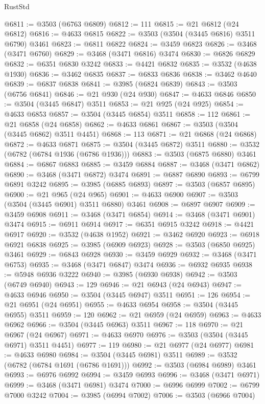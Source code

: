 \begin{lexlean}{RustStd}
\begin{coremodule}
@6811 := @3503 (@6763 @6809)
@6812 := 111
@6815 := @21 @6812 (@24 @6812)
@6816 := @4633 @6815
@6822 := @3503 (@3504 (@3445 @6816) @3511 @6790) @3461
@6823 := @6811 @6822
@6824 := @3459 @6823
@6826 := @3468 (@3471 @6760)
@6829 := @3468 (@3471 @6816) @3474
@6830 := @6826 @6829
@6832 := @6351 @6830 @3242
@6833 := @4421 @6832
@6835 := @3532 (@4638 @1930)
@6836 := @3462 @6835
@6837 := @6833 @6836
@6838 := @3462 @4640
@6839 := @6837 @6838
@6841 := @3985 (@6824 @6839)
@6843 := @3503 (@6756 @6841)
@6846 := @21 @930 (@24 @930)
@6847 := @4633 @6846
@6850 := @3504 (@3445 @6847) @3511
@6853 := @21 @925 (@24 @925)
@6854 := @4633 @6853
@6857 := @3504 (@3445 @6854) @3511
@6858 := 112
@6861 := @21 @6858 (@24 @6858)
@6862 := @4633 @6861
@6867 := @3503 (@3504 (@3445 @6862) @3511 @4451)
@6868 := 113
@6871 := @21 @6868 (@24 @6868)
@6872 := @4633 @6871
@6875 := @3504 (@3445 @6872) @3511
@6880 := @3532 (@6782 (@6784 @1936 (@6786 @1936)))
@6883 := @3503 (@6875 @6880) @3461
@6884 := @6867 @6883
@6885 := @3459 @6884
@6887 := @3468 (@3471 @6862)
@6890 := @3468 (@3471 @6872) @3474
@6891 := @6887 @6890
@6893 := @6799 @6891 @3242
@6895 := @3985 (@6885 @6893)
@6897 := @3503 (@6857 @6895)
@6900 := @21 @965 (@24 @965)
@6901 := @4633 @6900
@6907 := @3503 (@3504 (@3445 @6901) @3511 @6880) @3461
@6908 := @6897 @6907
@6909 := @3459 @6908
@6911 := @3468 (@3471 @6854)
@6914 := @3468 (@3471 @6901) @3474
@6915 := @6911 @6914
@6917 := @6351 @6915 @3242
@6918 := @4421 @6917
@6920 := @3532 (@4638 @1952)
@6921 := @3462 @6920
@6923 := @6918 @6921 @6838
@6925 := @3985 (@6909 @6923)
@6928 := @3503 (@6850 @6925) @3461
@6929 := @6843 @6928
@6930 := @3459 @6929
@6932 := @3468 (@3471 @6753)
@6935 := @3468 (@3471 @6847) @3474
@6936 := @6932 @6935
@6938 := @5948 @6936 @3222
@6940 := @3985 (@6930 @6938)
@6942 := @3503 (@6749 @6940)
@6943 := 129
@6946 := @21 @6943 (@24 @6943)
@6947 := @4633 @6946
@6950 := @3504 (@3445 @6947) @3511
@6951 := 126
@6954 := @21 @6951 (@24 @6951)
@6955 := @4633 @6954
@6958 := @3504 (@3445 @6955) @3511
@6959 := 120
@6962 := @21 @6959 (@24 @6959)
@6963 := @4633 @6962
@6966 := @3504 (@3445 @6963) @3511
@6967 := 118
@6970 := @21 @6967 (@24 @6967)
@6971 := @4633 @6970
@6976 := @3503 (@3504 (@3445 @6971) @3511 @4451)
@6977 := 119
@6980 := @21 @6977 (@24 @6977)
@6981 := @4633 @6980
@6984 := @3504 (@3445 @6981) @3511
@6989 := @3532 (@6782 (@6784 @1691 (@6786 @1691)))
@6992 := @3503 (@6984 @6989) @3461
@6993 := @6976 @6992
@6994 := @3459 @6993
@6996 := @3468 (@3471 @6971)
@6999 := @3468 (@3471 @6981) @3474
@7000 := @6996 @6999
@7002 := @6799 @7000 @3242
@7004 := @3985 (@6994 @7002)
@7006 := @3503 (@6966 @7004)

\end{coremodule}
\end{lexlean}
